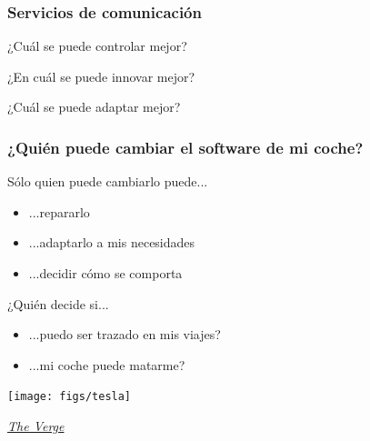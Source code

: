 \documentclass[17pt,aspectratio=169]{beamer}
\begin{document}
\begin{frame}
\frametitle{Servicios de comunicación}

\begin{flushright}
  {\Large
    ¿Cuál se puede controlar mejor? \\

    \vspace{.5cm}
    
    ¿En cuál se puede innovar mejor? \\

    \vspace{.5cm}

    ¿Cuál se puede adaptar mejor? \\
  }
    \end{flushright}

\end{frame}


\begin{frame}
\frametitle{¿Quién puede cambiar el software de mi coche?}

Sólo quien puede cambiarlo puede...

\begin{itemize}
\item ...repararlo
\item ...adaptarlo a mis necesidades
\item ...decidir cómo se comporta
\end{itemize}

¿Quién decide si...

\begin{itemize}
\item ...puedo ser trazado en mis viajes?
\item ...mi coche puede matarme?
\end{itemize}

\end{frame}

\begin{frame}[fragile]

  \begin{center}
  \texttt{[image: figs/tesla]}
  \end{center}

  \begin{flushright}
    {\em
      \href{https://www.theverge.com/2017/9/10/16283330/tesla-hurricane-irma-update-florida-extend-range-model-s-x-60-60d}{The Verge} \\
      }
  \end{flushright}
  
\end{frame}
\end{document}
